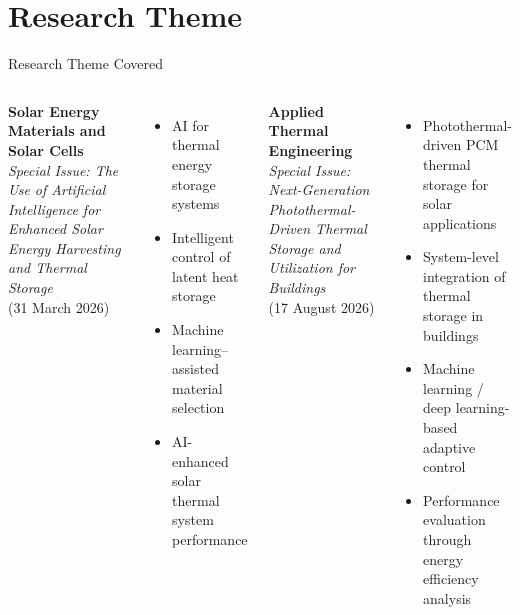 \documentclass[aspectratio=169, 11pt]{beamer}
\begin{document}
\section{Research Theme}
\begin{frame}{Research Theme Covered}

\begin{columns}[T] %

\textbf{Solar Energy Materials and Solar Cells}\\
\textit{Special Issue: The Use of Artificial Intelligence for Enhanced Solar Energy Harvesting and Thermal Storage}
\cite{SpecialIssueAI2026}\\
{\footnotesize (31 March 2026)}

\vspace{0.2cm}
\begin{itemize}
    \item AI for thermal energy storage systems
    \item Intelligent control of latent heat storage
    \item Machine learning--assisted material selection
    \item AI-enhanced solar thermal system performance
\end{itemize}

\textbf{Applied Thermal Engineering}\\
\textit{Special Issue: Next-Generation Photothermal-Driven Thermal Storage and Utilization for Buildings}
\cite{SpecialIssueATE2026}\\
{\footnotesize (17 August 2026)}

\vspace{0.2cm}
\begin{itemize}
    \item Photothermal-driven PCM thermal storage for solar applications
    \item System-level integration of thermal storage in buildings
    \item Machine learning / deep learning-based adaptive control
    \item Performance evaluation through energy efficiency analysis
\end{itemize}

\end{columns}

\end{frame}
\end{document}
